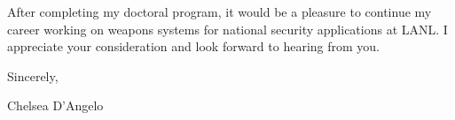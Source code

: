 \documentclass[a4paper,10pt]{article}
\begin{document}
\vspace{5mm} %


\vspace{2mm}

After completing my doctoral program, it would be a pleasure 
to continue my career working on weapons systems for
national security applications at LANL.  
I appreciate your consideration and look forward to hearing from you. 
  \vspace{6mm}
  
  Sincerely, \\ \vspace{-4mm}
  
  
  Chelsea D'Angelo
  
  \endgroup
\end{document}
